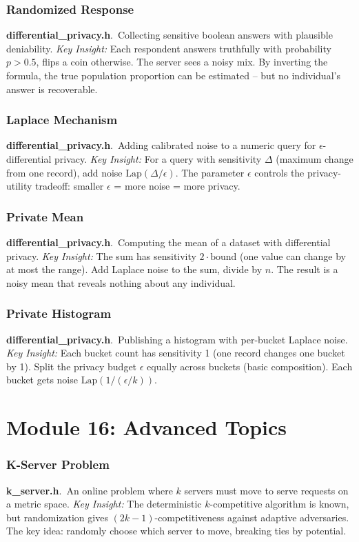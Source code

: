 \documentclass[11pt,a4paper]{article}
\newcommand{\algo}[2]{\textbf{#1}.\ #2}
\newcommand{\insight}{\textit{Key Insight: }}
\begin{document}
\subsubsection{Randomized Response}
\algo{differential\_privacy.h}{Collecting sensitive boolean answers with plausible deniability.}
\insight Each respondent answers truthfully with probability \(p > 0.5\), flips a coin otherwise. The server sees a noisy mix. By inverting the formula, the true population proportion can be estimated -- but no individual's answer is recoverable.

\subsubsection{Laplace Mechanism}
\algo{differential\_privacy.h}{Adding calibrated noise to a numeric query for \(\epsilon\)-differential privacy.}
\insight For a query with sensitivity \(\Delta\) (maximum change from one record), add noise \(\text{Lap}(\Delta/\epsilon)\). The parameter \(\epsilon\) controls the privacy-utility tradeoff: smaller \(\epsilon\) = more noise = more privacy.

\subsubsection{Private Mean}
\algo{differential\_privacy.h}{Computing the mean of a dataset with differential privacy.}
\insight The sum has sensitivity \(2 \cdot \text{bound}\) (one value can change by at most the range). Add Laplace noise to the sum, divide by \(n\). The result is a noisy mean that reveals nothing about any individual.

\subsubsection{Private Histogram}
\algo{differential\_privacy.h}{Publishing a histogram with per-bucket Laplace noise.}
\insight Each bucket count has sensitivity 1 (one record changes one bucket by 1). Split the privacy budget \(\epsilon\) equally across buckets (basic composition). Each bucket gets noise \(\text{Lap}(1 / (\epsilon/k))\).

\section{Module 16: Advanced Topics}
\label{sec:advanced}

\subsubsection{K-Server Problem}
\algo{k\_server.h}{An online problem where \(k\) servers must move to serve requests on a metric space.}
\insight The deterministic \(k\)-competitive algorithm is known, but randomization gives \((2k-1)\)-competitiveness against adaptive adversaries. The key idea: randomly choose which server to move, breaking ties by potential.
\end{document}
